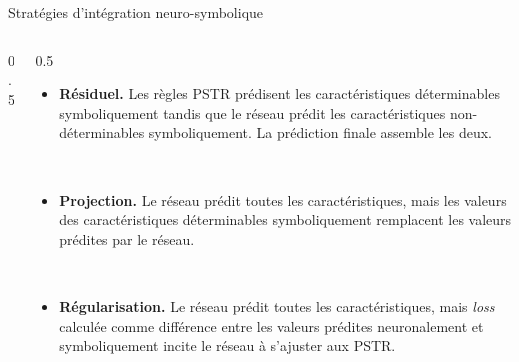\documentclass[aspectratio=169]{beamer}
\begin{document}
\begin{frame}{Stratégies d'intégration neuro-symbolique}

  \begin{columns}[c,totalwidth=\textwidth]
    \begin{column}{0.5\textwidth}
      \centering
      \vspace{-1cm}
      \resizebox{!}{0.97\textheight}{}
    \end{column}
    \begin{column}{0.5\textwidth}
      \scriptsize
      \begin{itemize}
        \setlength{\itemsep}{0.45em}

        \item \textbf{Résiduel.}
              Les règles PSTR prédisent les caractéristiques déterminables symboliquement tandis que le réseau prédit
              les caractéristiques non-déterminables symboliquement. La prédiction finale assemble les deux.

              \ \\

        \item \textbf{Projection.}
              Le réseau prédit toutes les caractéristiques, mais les valeurs des caractéristiques déterminables symboliquement remplacent les valeurs prédites par le réseau.

              \ \\

        \item \textbf{Régularisation.}
              Le réseau prédit toutes les caractéristiques, mais \textit{loss} calculée comme différence entre les valeurs prédites neuronalement et symboliquement incite le réseau à s'ajuster aux PSTR.

      \end{itemize}
    \end{column}
  \end{columns}

\end{frame}
\end{document}
